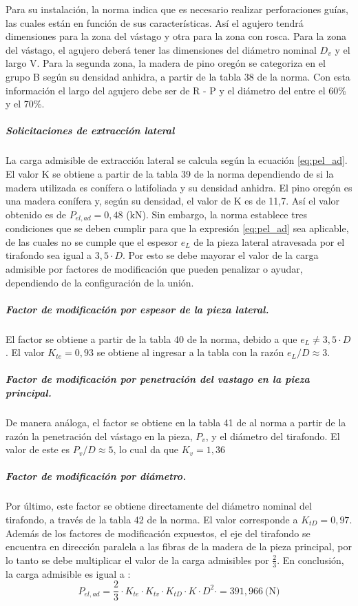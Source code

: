 Para su instalación, la norma indica que es necesario realizar perforaciones guías, las cuales están en función de sus características. Así el agujero tendrá dimensiones para la zona del vástago y otra para la zona con rosca. Para la zona del vástago, el agujero deberá tener las dimensiones del diámetro nominal $D_v$ y el largo V. Para la segunda zona, la madera de pino oregón se categoriza en el grupo B según su densidad anhidra, a partir de la tabla 38 de la norma. Con esta información el largo del agujero debe ser de R - P  y el diámetro del entre el 60\% y el 70\%.
\subparagraph{Solicitaciones de extracción lateral}
La carga admisible de extracción lateral se calcula según la ecuación \ref{eq:pel_ad}. El valor K se obtiene a partir de la tabla 39 de la norma dependiendo de si la madera utilizada es conífera o latifoliada y su densidad anhidra. El pino oregón es una madera conífera y, según su densidad, el valor de K es de 11,7. Así el valor obtenido es de $P_{el,ad} = 0,48$ (kN). Sin embargo, la norma establece tres condiciones que se deben cumplir para que la expresión \ref{eq:pel_ad} sea aplicable, de las cuales no se cumple que el espesor $e_L$ de la pieza lateral atravesada por el tirafondo sea igual a $3,5\cdot D$. Por esto se debe mayorar el valor de la carga admisible por factores de modificación que pueden penalizar o ayudar, dependiendo de la configuración de la unión.

\subparagraph{Factor de modificación por espesor de la pieza lateral.}
El factor se obtiene a partir de la tabla 40 de la norma, debido a que $e_L \neq 3,5\cdot D$. El valor $K_{te}=0,93$ se obtiene al ingresar a la tabla con la razón $e_L/D \approx 3$.

\subparagraph{Factor de modificación por penetración del vastago en la pieza principal.}
De manera análoga, el factor se obtiene en la tabla 41 de al norma a partir de la razón la penetración del vástago en la pieza, $P_v$, y el diámetro del tirafondo. El valor de este es $P_v/D \approx 5$, lo cual da que $K_v=1,36$

\subparagraph{Factor de modificación por diámetro.}
Por último, este factor se obtiene directamente del diámetro nominal del tirafondo, a través de la tabla 42 de la norma. El valor corresponde a $K_{tD}=0,97$.
\\

Además de los factores de modificación expuestos, el eje del tirafondo se encuentra en dirección paralela a las fibras de la madera de la pieza principal, por lo tanto se debe multiplicar el valor de la carga admisibles por $\frac{2}{3}$. En conclusión, la carga admisible es igual a :
\begin{equation}
	P_{el,ad} = \frac{2}{3}\cdot K_{te}\cdot K_{tv}\cdot K_{tD} \cdot K\cdot D^2\cdot = 391,966 \: \text{(N)}
\end{equation}

